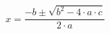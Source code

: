 \documentclass[10pt, a5paper]{article}
\begin{document}
	$$
	x = \dfrac{-b \pm \sqrt{b^2 - 4 \cdot a \cdot c}}{2 \cdot a}
	$$
\end{document}
